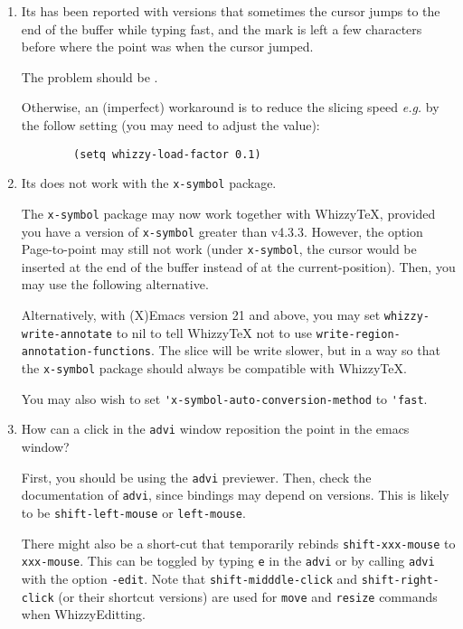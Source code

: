 \documentclass{article}
\let \lst \verb
\begin{document}
\begin {enumerate}

\item
Its has been reported with versions that sometimes the cursor jumps to the
end of the buffer while typing fast, and the mark is left a few characters
before where the point was when the cursor jumped.

The problem should be \FIXED. 

Otherwise, an (imperfect) workaround is to reduce the slicing speed
\emph{e.g.}  by the follow setting (you may need to adjust the value):
\begin{verbatim}
        (setq whizzy-load-factor 0.1)
\end{verbatim}


\item Its does not work with the  \lst"x-symbol" package.

The \lst"x-symbol" package may now work together with WhizzyTeX, provided
you have a version of {\tt x-symbol} greater than v4.3.3.  However, the
option Page-to-point may still not work (under \lst"x-symbol", the cursor
would be inserted at the end of the buffer instead of at the
current-position).  Then, you may use the following alternative.

Alternatively, with (X)Emacs version 21 and above, you may set
\lst"whizzy-write-annotate" to nil to tell WhizzyTeX not to use
\lst"write-region-annotation-functions". The slice will be write slower, but
in a way so that the \lst"x-symbol" package should always be compatible with 
WhizzyTeX. 

You may also wish to set \lst"'x-symbol-auto-conversion-method" to
\lst"'fast".

\item How can a click in the \lst"advi" window reposition the point
in the emacs window?

First, you should be using the \lst"advi" previewer.  Then, check the
documentation of \lst"advi", since bindings may depend on versions. This is
likely to be \lst"shift-left-mouse" or \lst"left-mouse".

There might also be a short-cut that temporarily rebinds
\lst"shift-xxx-mouse" to \lst"xxx-mouse". This can be toggled by typing
\lst"e"   in the \lst"advi" or by calling \lst"advi" with the option
\lst"-edit". 
%
Note that \lst"shift-midddle-click" and \lst"shift-right-click" (or their
shortcut versions) are used for \lst"move" and \lst"resize" commands when
WhizzyEditting.


\end {enumerate}
\end{document}
